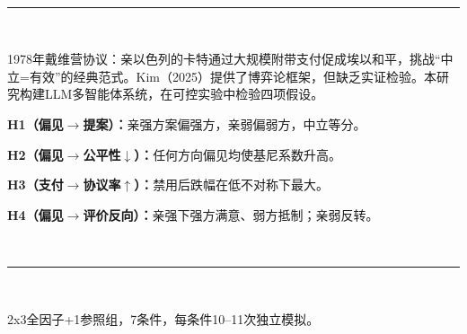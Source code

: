 \documentclass{article}
\begin{document}
\vspace{4mm}
\begin{minipage}[t]{841mm}
\hspace{20mm}\begin{minipage}[t]{259mm}

\noindent\colorbox{fblue!12}{\begin{minipage}{259mm}\vspace{2mm}\vspace{2mm}\end{minipage}}\\[1mm]
\textcolor{gold}{\rule{259mm}{1.5pt}}\\[2mm]

{\fontsize{24}{34}\selectfont\raggedright%
1978年戴维营协议：亲以色列的卡特通过{\color{ared}大规模附带支付}促成埃以和平，挑战“中立=有效”的经典范式。Kim（2025）提供了博弈论框架，但{\color{ared}缺乏实证检验}。本研究构建LLM多智能体系统，在可控实验中检验四项假设。

\vspace{2mm}
\textbf{H1（偏见$\to$提案）：}亲强方案偏强方，亲弱偏弱方，中立等分。

\textbf{H2（偏见$\to$公平性$\downarrow$）：}任何方向偏见均使基尼系数升高。

\textbf{H3（支付$\to$协议率$\uparrow$）：}禁用后跌幅在低不对称下最大。

\textbf{H4（偏见$\to$评价反向）：}亲强下强方满意、弱方抵制；亲弱反转。
\par}

\vspace{4mm}

\noindent\colorbox{fblue!12}{\begin{minipage}{259mm}\vspace{2mm}\vspace{2mm}\end{minipage}}\\[1mm]
\textcolor{gold}{\rule{259mm}{1.5pt}}\\[2mm]

{\fontsize{24}{34}\selectfont\raggedright 2x3全因子+1参照组，7条件，每条件10--11次独立模拟。
\par}


\end{minipage}
\end{minipage}
\end{document}
